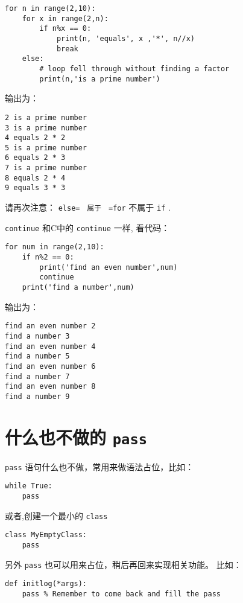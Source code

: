 \documentclass[10pt,a4paper,UTF8]{article}
\begin{document}
\lstset{language=Python,label= ,caption= ,captionpos=b,numbers=none}
\begin{lstlisting}
for n in range(2,10):
    for x in range(2,n):
        if n%x == 0:
            print(n, 'equals', x ,'*', n//x)
            break
    else:
        # loop fell through without finding a factor
        print(n,'is a prime number')
\end{lstlisting}

输出为：
\begin{verbatim}
2 is a prime number
3 is a prime number
4 equals 2 * 2
5 is a prime number
6 equals 2 * 3
7 is a prime number
8 equals 2 * 4
9 equals 3 * 3
\end{verbatim}

请再次注意： \texttt{else=　属于　=for} 不属于 \texttt{if} .

\texttt{continue} 和C中的 \texttt{continue} 一样, 看代码：
\lstset{language=Python,label= ,caption= ,captionpos=b,numbers=none}
\begin{lstlisting}
for num in range(2,10):
    if n%2 == 0:
        print('find an even number',num)
        continue
    print('find a number',num)
\end{lstlisting}

输出为：
\begin{verbatim}
find an even number 2
find a number 3
find an even number 4
find a number 5
find an even number 6
find a number 7
find an even number 8
find a number 9
\end{verbatim}
\section{什么也不做的 \texttt{pass}}
\label{sec:orgf569f06}


\texttt{pass} 语句什么也不做，常用来做语法占位，比如：
\lstset{language=Python,label= ,caption= ,captionpos=b,numbers=none}
\begin{lstlisting}
while True:
    pass
\end{lstlisting}

或者,创建一个最小的 \texttt{class} 
\lstset{language=Python,label= ,caption= ,captionpos=b,numbers=none}
\begin{lstlisting}
class MyEmptyClass:
    pass
\end{lstlisting}
另外 \texttt{pass} 也可以用来占位，稍后再回来实现相关功能。 比如：
\lstset{language=Python,label= ,caption= ,captionpos=b,numbers=none}
\begin{lstlisting}
def initlog(*args):
    pass % Remember to come back and fill the pass
\end{lstlisting}
\end{document}

